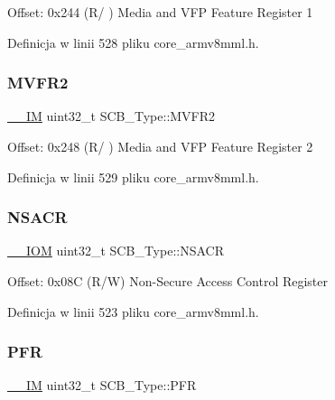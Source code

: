 Offset\+: 0x244 (R/ ) Media and V\+FP Feature Register 1 

Definicja w linii 528 pliku core\+\_\+armv8mml.\+h.

\mbox{\label{struct_s_c_b___type_a280ef961518ecee3ed43a86404853c3d}} 
\subsubsection{\texorpdfstring{M\+V\+F\+R2}{MVFR2}}
{\footnotesize\ttfamily \hyperlink{core__sc300_8h_a4cc1649793116d7c2d8afce7a4ffce43}{\+\_\+\+\_\+\+IM} uint32\+\_\+t S\+C\+B\+\_\+\+Type\+::\+M\+V\+F\+R2}

Offset\+: 0x248 (R/ ) Media and V\+FP Feature Register 2 

Definicja w linii 529 pliku core\+\_\+armv8mml.\+h.

\mbox{\label{struct_s_c_b___type_a525790dfb9d9e3dd8eb126cdfebcd472}} 
\subsubsection{\texorpdfstring{N\+S\+A\+CR}{NSACR}}
{\footnotesize\ttfamily \hyperlink{core__sc300_8h_ab6caba5853a60a17e8e04499b52bf691}{\+\_\+\+\_\+\+I\+OM} uint32\+\_\+t S\+C\+B\+\_\+\+Type\+::\+N\+S\+A\+CR}

Offset\+: 0x08C (R/W) Non-\/\+Secure Access Control Register 

Definicja w linii 523 pliku core\+\_\+armv8mml.\+h.

\mbox{\label{struct_s_c_b___type_a40745bb0af880c45827a653222d54117}} 
\subsubsection{\texorpdfstring{P\+FR}{PFR}}
{\footnotesize\ttfamily \hyperlink{core__sc300_8h_a4cc1649793116d7c2d8afce7a4ffce43}{\+\_\+\+\_\+\+IM} uint32\+\_\+t S\+C\+B\+\_\+\+Type\+::\+P\+FR}

